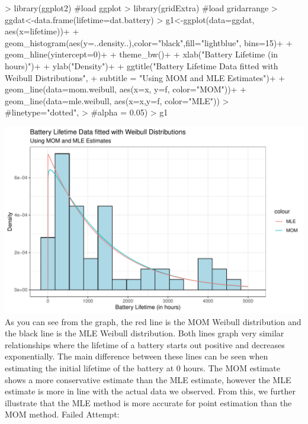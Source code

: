 \documentclass{article}
\begin{document}
\begin{enumerate}
\begin{enumerate}
\begin{Schunk}
\begin{Sinput}
> library(ggplot2) #load ggplot
> library(gridExtra) #load gridarrange
> ggdat<-data.frame(lifetime=dat.battery)
> g1<-ggplot(data=ggdat, aes(x=lifetime))+
+   geom_histogram(aes(y=..density..),color="black",fill="lightblue", bins=15)+
+   geom_hline(yintercept=0)+
+   theme_bw()+
+   xlab("Battery Lifetime (in hours)")+
+   ylab("Density")+
+   ggtitle("Battery Lifetime Data fitted with Weibull Distributions", 
+           subtitle = "Using MOM and MLE Estimates")+
+   geom_line(data=mom.weibull, aes(x=x, y=f, color="MOM"))+
+   geom_line(data=mle.weibull, aes(x=x,y=f, color="MLE"))
>                  #linetype="dotted", 
>                  #alpha = 0.05)
> g1
\end{Sinput}
\end{Schunk}
\includegraphics{HW2-005}
\newline
\cite{ggplot}
\cite{gridExtra}
\newline
As you can see from the graph, the red line is the MOM Weibull distribution and the black line is the MLE Weibull distribution. Both lines graph very similar relationships where the lifetime of a battery starts out positive and decreases exponentially. The main difference between these lines can be seen when estimating the initial lifetime of the battery at 0 hours. The MOM estimate shows a more conservative estimate than the MLE estimate, however the MLE estimate is more in line with the actual data we observed. From this, we further illustrate that the MLE method is more accurate for point estimation than the MOM method. 
\newline
\newline
Failed Attempt:
\newline

\end{enumerate}
\end{enumerate}
\end{document}
